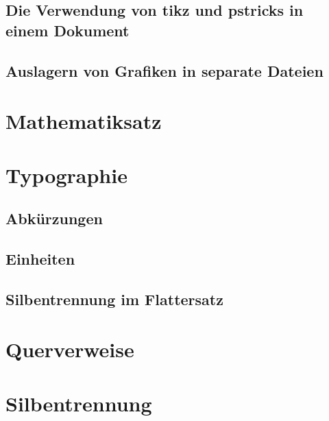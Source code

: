\documentclass[%
  english,ngerman,%
  geometry=no,DIV=12,automark,%
]{tudscrartcl}
\begin{document}
\subsection{Die Verwendung von tikz und pstricks in einem Dokument}


\subsection{Auslagern von Grafiken in separate Dateien}



\section{Mathematiksatz}



\section{Typographie}


\subsection{Abkürzungen}


\subsection{Einheiten}


\subsection{Silbentrennung im Flattersatz}



\section{Querverweise}
\label{sec:references}



\section{Silbentrennung}
\end{document}
